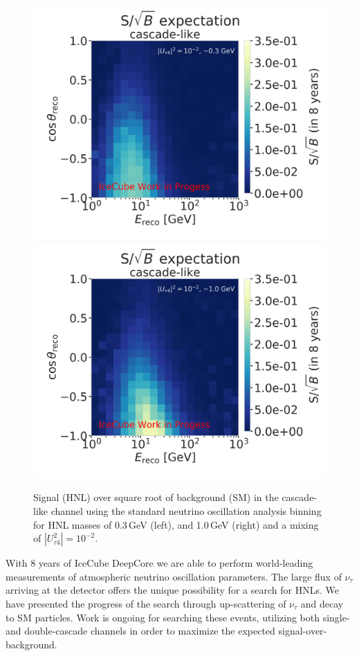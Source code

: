 \documentclass[a4paper,11pt]{article}
\begin{document}
\begin{figure}[h!]
  \includegraphics[trim = 0cm 0cm 7.15cm 2.0cm, clip, height=0.4\linewidth]{figures/2_d_S_over_sqrt(B)_taupede_reco_energy_taupede_reco_coszen_around_0.3_GeV_new.png}
  \includegraphics[trim = 0cm 0cm 0cm 2.0cm, clip, height=0.4\linewidth]{figures/2_d_S_over_sqrt(B)_taupede_reco_energy_taupede_reco_coszen_around_1.0_GeV_new.png}
  \caption{Signal (HNL) over square root of background (SM) in the cascade-like channel using the standard neutrino oscillation analysis binning for HNL masses of 0.3\,GeV (left), and 1.0\,GeV (right) and a mixing of $|U_{\tau4}^2|=10^{-2}$.}
  \label{fig:s_over_sqrt_B_HNL}
\end{figure}

With 8 years of IceCube DeepCore we are able to perform world-leading measurements of atmospheric neutrino oscillation parameters. The large flux of $\nu_\tau$ arriving at the detector offers the unique possibility for a search for HNLs. We have presented the progress of the search through up-scattering of $\nu_\tau$ and decay to SM particles. Work is ongoing for searching these events, utilizing both single- and double-cascade channels in order to maximize the expected signal-over-background.

\begingroup
    \scriptsize
    
    
\endgroup
\end{document}
